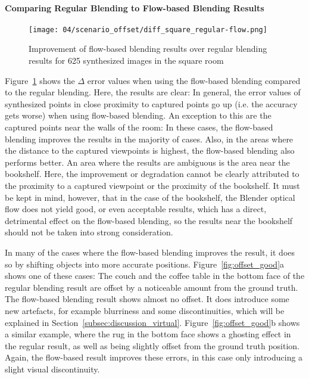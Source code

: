 \paragraph{Comparing Regular Blending to Flow-based Blending Results}

\begin{figure}
		\centering
		\texttt{[image: 04/scenario\_offset/diff\_square\_regular-flow.png]}
		\caption{Improvement of flow-based blending results over regular blending results for 625 synthesized images in the square room}
		\label{fig:scenario_offset_diff}
\end{figure}

Figure~\ref{fig:scenario_offset_diff} shows the $\Delta$ error values when using the flow-based blending compared to the regular blending. Here, the results are clear: In general, the error values of synthesized points in close proximity to captured points go up (i.e. the accuracy gets worse) when using flow-based blending. An exception to this are the captured points near the walls of the room: In these cases, the flow-based blending improves the results in the majority of cases. Also, in the areas where the distance to the captured viewpoints is highest, the flow-based blending also performs better. An area where the results are ambiguous is the area near the bookshelf. Here, the improvement or degradation cannot be clearly attributed to the proximity to a captured viewpoint or the proximity of the bookshelf. It must be kept in mind, however, that in the case of the bookshelf, the Blender optical flow does not yield good, or even acceptable results, which has a direct, detrimental effect on the flow-based blending, so the results near the bookshelf should not be taken into strong consideration.

In many of the cases where the flow-based blending improves the result, it does so by shifting objects into more accurate positions. Figure~\ref{fig:offset_good}a shows one of these cases: The couch and the coffee table in the bottom face of the regular blending result are offset by a noticeable amount from the ground truth. The flow-based blending result shows almost no offset. It does introduce some new artefacts, for example blurriness and some discontinuities, which will be explained in Section~\ref{subsec:discussion_virtual}. Figure~\ref{fig:offset_good}b shows a similar example, where the rug in the bottom face shows a ghosting effect in the regular result, as well as being slightly offset from the ground truth position. Again, the flow-based result improves these errors, in this case only introducing a slight visual discontinuity.

